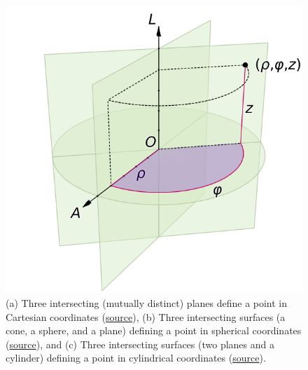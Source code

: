 \documentclass{book}
\theoremstyle{definition}
\begin{document}
\begin{figure}[h!]
	\includegraphics[scale=0.2]{gr-fig-4c.png}
	\caption{(a) Three intersecting (mutually distinct) planes define a point in Cartesian coordinates (\href{https://en.wikipedia.org/wiki/Cartesian_coordinate_system}{source}), (b) Three intersecting surfaces (a cone, a sphere, and a plane) defining a point in spherical coordinates (\href{https://en.wikipedia.org/wiki/Curvilinear_coordinates}{source}), and (c) Three intersecting surfaces (two planes and a cylinder) defining a point in cylindrical coordinates (\href{https://en.wikipedia.org/wiki/Cylindrical_coordinate_system}{source}).}
\end{figure}
\end{document}

